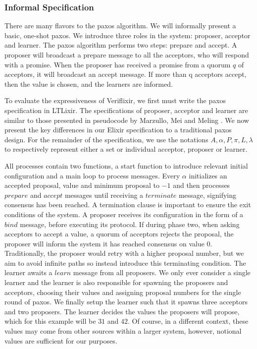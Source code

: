 \subsubsection{Informal Specification}
There are many flavors to the paxos algorithm. We will informally present a basic, one-shot paxos. We introduce three roles in the system: proposer, acceptor and learner. The paxos algorithm performs two steps: prepare and accept. A proposer will broadcast a prepare message to all the acceptors, who will respond with a promise. When the proposer has received a promise from a quorum $q$ of acceptors, it will broadcast an accept message. If more than q acceptors accept, then the value is chosen, and the learners are informed.
\par
To evaluate the expressiveness of Veriflixir, we first must write the paxos specification in LTLixir. The specifications of proposer, acceptor and learner are similar to those presented in pseudocode by Marzullo, Mei and Meling \cite{paxos_pseudocode}. We now present the key differences in our Elixir specification to a traditional paxos design. For the remainder of the specification, we use the notations $A, \alpha, P, \pi, L, \lambda$ to respectively represent either a set or individual acceptor, proposer or learner.
\par
All processes contain two functions, a start function to introduce relevant initial configuration and a main loop to process messages. Every $\alpha$ initializes an accepted proposal, value and minimum proposal to $-1$ and then processes $prepare$ and $accept$ messages until receiving a $terminate$ message, signifying consensus has been reached. A termination clause is important to ensure the exit conditions of the system. A proposer receives its configuration in the form of a $bind$ message, before executing its protocol. If during phase two, when asking acceptors to accept a value, a quorum of acceptors rejects the proposal, the proposer will inform the system it has reached consensus on value $0$. Traditionally, the proposer would retry with a higher proposal number, but we aim to avoid infinite paths so instead introduce this terminating condition. The learner awaits a $learn$ message from all proposers. We only ever consider a single learner and the learner is also responsible for spawning the proposers and acceptors, choosing their values and assigning proposal numbers for the single round of paxos. We finally setup the learner such that it spawns three acceptors and two proposers. The learner decides the values the proposers will propose, which for this example will be $31$ and $42$. Of course, in a different context, these values may come from other sources within a larger system, however, notional values are sufficient for our purposes.
